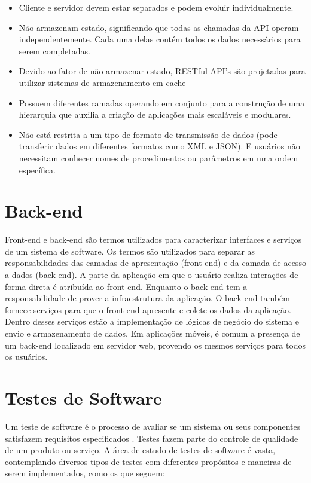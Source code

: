\begin{itemize}
    \item Cliente e servidor devem estar separados e podem evoluir individualmente.
    \item Não armazenam estado, significando que todas as chamadas da API operam independentemente. Cada uma delas contém todos os dados necessários para serem completadas.
    \item Devido ao fator de não armazenar estado, RESTful API's são projetadas para utilizar sistemas de armazenamento em cache
    \item Possuem diferentes camadas operando em conjunto para a construção de uma hierarquia que auxilia a criação de aplicações mais escaláveis e modulares.
    \item Não está restrita a um tipo de formato de transmissão de dados (pode transferir dados em diferentes formatos como XML e JSON). E usuários não necessitam conhecer nomes de procedimentos ou parâmetros em uma ordem específica.
\end{itemize}

\section{Back-end}
Front-end e back-end são termos utilizados para caracterizar interfaces e serviços de um sistema de software. Os termos são utilizados para separar as responsabilidades das camadas de apresentação (front-end) e da camada de acesso a dados (back-end). A parte da aplicação em que o usuário realiza interações de forma direta é atribuída ao front-end. Enquanto o back-end tem a responsabilidade de prover a infraestrutura da aplicação. O back-end também fornece serviços para que o front-end apresente e colete os dados da aplicação. Dentro desses serviços estão a implementação de lógicas de negócio do sistema e envio e armazenamento de dados. Em aplicações móveis, é comum a presença de um back-end localizado em servidor web, provendo os mesmos serviços para todos os usuários.

\section{Testes de Software}
Um teste de software é o processo de avaliar se um sistema ou seus componentes satisfazem requisitos especificados \cite{software-testing}. Testes fazem parte do controle de qualidade de um produto ou serviço. A área de estudo de testes de software é vasta, contemplando diversos tipos de testes com diferentes propósitos e maneiras de serem implementados, como os que seguem:

